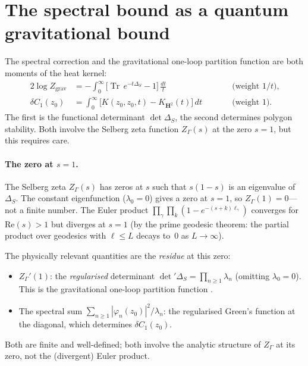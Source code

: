 \section{The spectral bound as a quantum gravitational bound}

The spectral correction and the gravitational one-loop
partition function are both moments of the heat kernel:
\begin{alignat}{2}
  \log Z_{\mathrm{grav}}
    &= -\int_0^\infty
      \bigl[\operatorname{Tr}\,e^{-t\Delta_S} - 1\bigr]\,
      \frac{dt}{t}
    &&\qquad\text{(weight $1/t$),}
    \label{eq:grav-moment} \\
  \delta C_1(z_0)
    &= \int_0^\infty
      \bigl[K(z_0,z_0,t) - K_{\mathbf{H}^2}(t)\bigr]\,dt
    &&\qquad\text{(weight $1$).}
    \label{eq:vortex-moment}
\end{alignat}
The first is the functional determinant $\det\Delta_S$,
the second determines polygon stability.
Both involve the Selberg zeta function $Z_\Gamma(s)$
at the zero $s = 1$, but this requires care.

\paragraph{The zero at $s = 1$.}
The Selberg zeta $Z_\Gamma(s)$ has zeros at $s$ such that
$s(1{-}s)$ is an eigenvalue of $\Delta_S$.
The constant eigenfunction ($\lambda_0 = 0$) gives a zero
at $s = 1$, so $Z_\Gamma(1) = 0$---not a finite number.
The Euler product
$\prod_\gamma \prod_k (1 - e^{-(s+k)\ell_\gamma})$
converges for $\mathrm{Re}(s) > 1$ but diverges at $s = 1$
(by the prime geodesic theorem: the partial product over
geodesics with $\ell \le L$ decays to~$0$ as $L \to \infty$).

The physically relevant quantities are the \emph{residue}
at this zero:
\begin{itemize}
  \item $Z_\Gamma'(1)$: the \emph{regularised} determinant
    $\det{}'\Delta_S = \prod_{n \ge 1} \lambda_n$ (omitting
    $\lambda_0 = 0$).
    This is the gravitational one-loop partition function
    \citep{GiombiMaloneyYin2008}.
  \item The spectral sum
    $\sum_{n \ge 1} |\varphi_n(z_0)|^2 / \lambda_n$:
    the regularised Green's function at the diagonal,
    which determines $\delta C_1(z_0)$.
\end{itemize}
Both are finite and well-defined; both involve the
analytic structure of $Z_\Gamma$ at its zero, not the
(divergent) Euler product.


